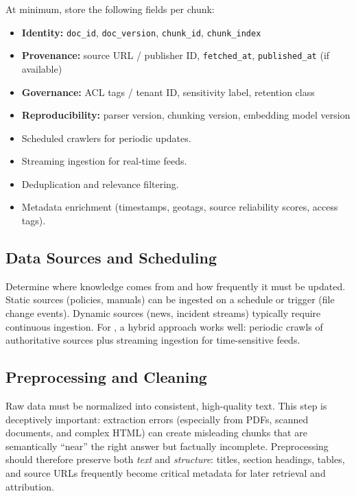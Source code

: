 \begin{tcolorbox}[
  title={\textbf{Engineering sidebar: A minimal ingestion contract}},
  colback=gray!5,
  colframe=gray!60!black,
  colbacktitle=gray!20,
  coltitle=black,
  fonttitle=\bfseries,
  boxrule=0.7pt,
  arc=4pt,
  left=5mm, right=5mm, top=4mm, bottom=4mm,
  before skip=6pt,
  after skip=6pt
]
\small
At minimum, store the following fields per chunk:
\begin{itemize}[leftmargin=1.5em, itemsep=3pt]
  \item \textbf{Identity:} \texttt{doc\_id}, \texttt{doc\_version}, \texttt{chunk\_id}, \texttt{chunk\_index}
  \item \textbf{Provenance:} source URL / publisher ID, \texttt{fetched\_at}, \texttt{published\_at} (if available)
  \item \textbf{Governance:} ACL tags / tenant ID, sensitivity label, retention class
  \item \textbf{Reproducibility:} parser version, chunking version, embedding model version
\end{itemize}
\end{tcolorbox}

\begin{itemize}
    \item Scheduled crawlers for periodic updates.
    \item Streaming ingestion for real-time feeds.
    \item Deduplication and relevance filtering.
    \item Metadata enrichment (timestamps, geotags, source reliability scores, access tags).
\end{itemize}

\subsection{Data Sources and Scheduling}
Determine where knowledge comes from and how frequently it must be updated. Static sources (policies, manuals) can be ingested on a schedule or trigger (file change events). Dynamic sources (news, incident streams) typically require continuous ingestion. For \ishtar{}, a hybrid approach works well: periodic crawls of authoritative sources plus streaming ingestion for time-sensitive feeds.

\subsection{Preprocessing and Cleaning}
Raw data must be normalized into consistent, high-quality text. This step is deceptively important: extraction errors (especially from PDFs, scanned documents, and complex HTML) can create misleading chunks that are semantically ``near'' the right answer but factually incomplete. Preprocessing should therefore preserve both \emph{text} and \emph{structure}: titles, section headings, tables, and source URLs frequently become critical metadata for later retrieval and attribution.

